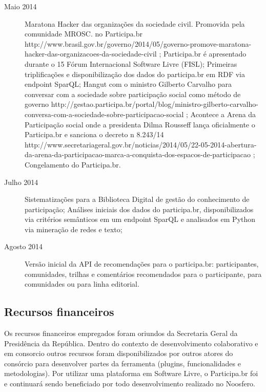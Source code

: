 \documentclass{article}
\begin{document}
\begin{description}
  \item [Maio 2014]
  Maratona Hacker das organizações da sociedade civil. Promovida pela comunidade MROSC. no Participa.br
  http://www.brasil.gov.br/governo/2014/05/governo-promove-maratona-hacker-das-organizacoes-da-sociedade-civil ;
  Participa.br é apresentado durante o 15 Fórum Internacional Software Livre (FISL);
  Primeiras triplificações e disponibilização dos dados do participa.br em RDF via endpoint SparQL;
  Hangut com o ministro Gilberto Carvalho para conversar com a sociedade sobre participação social como método de governo
  http://gestao.participa.br/portal/blog/ministro-gilberto-carvalho-conversa-com-a-sociedade-sobre-participacao-social ;
  Acontece a Arena da Participação social onde a presidenta Dilma Rousseff lança oficialmente o Participa.br e sanciona o decreto n 8.243/14
  http://www.secretariageral.gov.br/noticias/2014/05/22-05-2014-abertura-da-arena-da-participacao-marca-a-conquista-dos-espacos-de-participacao ;
  Congelamento do Participa.br.

  \item [Julho 2014]
  Sistematizações para a Biblioteca Digital de gestão do conhecimento de participação;
  Análises iniciais dos dados do participa.br, disponibilizados via critérios semânticos em um endpoint SparQL e analisados em Python via mineração de redes e texto;

  \item [Agosto 2014]
  Versão inicial da API de recomendações para o participa.br: participantes, comunidades, trilhas e comentários recomendados para o participante, para comunidades ou para linha editorial.

\end{description}

\subsection{Recursos financeiros}

Os recursos financeiros empregados foram oriundos da Secretaria Geral da
Presidência da República. Dentro do contexto de desenvolvimento colaborativo e
em consorcio outros recursos foram disponibilizados por outros atores do
consórcio para desenvolver partes da ferramenta (plugins, funcionalidades e
metodologias). Por utilizar uma plataforma em Software Livre, o Participa.br
foi e continuará sendo beneficiado por todo desenvolvimento realizado no
Noosfero.
\end{document}
